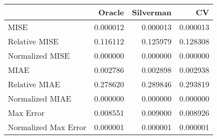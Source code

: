 \begin{tabular}{lrrr}
  \hline
 & Oracle & Silverman & CV \\ 
  \hline
MISE & 0.000012 & 0.000013 & 0.000013 \\ 
  Relative MISE & 0.116112 & 0.125979 & 0.128308 \\ 
  Normalized MISE & 0.000000 & 0.000000 & 0.000000 \\ 
  MIAE & 0.002786 & 0.002898 & 0.002938 \\ 
  Relative MIAE & 0.278620 & 0.289846 & 0.293819 \\ 
  Normalized MIAE & 0.000000 & 0.000000 & 0.000000 \\ 
  Max Error & 0.008551 & 0.009000 & 0.008926 \\ 
  Normalized Max Error & 0.000001 & 0.000001 & 0.000001 \\ 
   \hline
\end{tabular}
